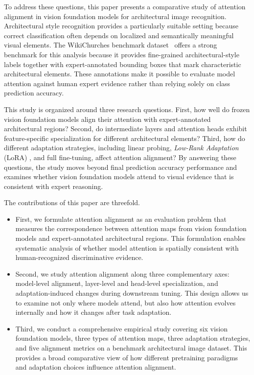 \documentclass[lineno,pdflatex,sn-mathphys-num]{sn-jnl}%
\theoremstyle{thmstyleone}%
\theoremstyle{thmstyletwo}%
\theoremstyle{thmstylethree}%
\begin{document}
To address these questions, this paper presents a comparative study of attention alignment in vision foundation models for architectural image recognition. Architectural style recognition provides a particularly suitable setting because correct classification often depends on localized and semantically meaningful visual elements. The WikiChurches benchmark dataset~\cite{Barz21WikiChurches} offers a strong benchmark for this analysis because it provides fine-grained architectural-style labels together with expert-annotated bounding boxes that mark characteristic architectural elements. These annotations make it possible to evaluate model attention against human expert evidence rather than relying solely on class prediction accuracy.

This study is organized around three research questions. First, how well do frozen vision foundation models align their attention with expert-annotated architectural regions? Second, do intermediate layers and attention heads exhibit feature-specific specialization for different architectural elements? Third, how do different adaptation strategies, including linear probing, \textit{Low-Rank Adaptation} (LoRA) \cite{hu2022lora}, and full fine-tuning, affect attention alignment? By answering these questions, the study moves beyond final prediction accuracy performance and examines whether vision foundation models attend to visual evidence that is consistent with expert reasoning.

The contributions of this paper are threefold.
\begin{itemize}
\item First, we formulate attention alignment as an evaluation problem that measures the correspondence between attention maps from vision foundation models and expert-annotated architectural regions. This formulation enables systematic analysis of whether model attention is spatially consistent with human-recognized discriminative evidence.
\item Second, we study attention alignment along three complementary axes: model-level alignment, layer-level and head-level specialization, and adaptation-induced changes during downstream tuning. This design allows us to examine not only where models attend, but also how attention evolves internally and how it changes after task adaptation.
\item Third, we conduct a comprehensive empirical study covering six vision foundation models, three types of attention maps, three adaptation strategies, and five alignment metrics on a benchmark architectural image dataset. This provides a broad comparative view of how different pretraining paradigms and adaptation choices influence attention alignment.
\end{itemize}
\end{document}
